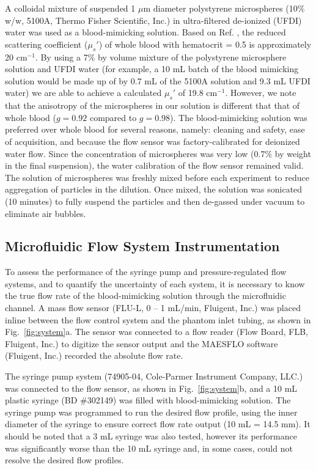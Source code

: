 \documentclass[12pt]{spieman}
\begin{document}
\begin{spacing}{2}
A colloidal mixture of suspended 1 $\mu$m diameter polystyrene microspheres (10\% w/w, 5100A, Thermo Fisher Scientific, Inc.) in ultra-filtered de-ionized (UFDI) water was used as a blood-mimicking solution. Based on Ref. \cite[]{Roggan:1999bz}, the reduced scattering coefficient ($\mu_s'$) of whole blood with hematocrit = 0.5 is approximately 20 cm$^{-1}$. By using a 7\% by volume mixture of the polystyrene microsphere solution and UFDI water (for example, a 10 mL batch of the blood mimicking solution would be made up of by 0.7 mL of the 5100A solution and 9.3 mL UFDI water) we are able to achieve a calculated $\mu_s'$ of 19.8 cm$^{-1}$. However, we note that the anisotropy of the microspheres in our solution is different that that of whole blood ($g = 0.92$ compared to $g = 0.98$). The blood-mimicking solution was preferred over whole blood for several reasons, namely: cleaning and safety, ease of acquisition, and because the flow sensor was factory-calibrated for deionized water flow. Since the concentration of microspheres was very low (0.7\% by weight in the final suspension), the water calibration of the flow sensor remained valid. The solution of microspheres was freshly mixed before each experiment to reduce aggregation of particles in the dilution. Once mixed, the solution was sonicated (10 minutes) to fully suspend the particles and then de-gassed under vacuum to eliminate air bubbles.


\subsection{Microfluidic Flow System Instrumentation}

To assess the performance of the syringe pump and pressure-regulated flow systems, and to quantify the uncertainty of each system, it is necessary to know the true flow rate of the blood-mimicking solution through the microfluidic channel. A mass flow sensor (FLU-L, 0 -- 1 mL/min, Fluigent, Inc.) was placed inline between the flow control system and the phantom inlet tubing, as shown in Fig.~\ref{fig:system}a. The sensor was connected to a flow reader (Flow Board, FLB, Fluigent, Inc.) to digitize the sensor output and the MAESFLO software (Fluigent, Inc.) recorded the absolute flow rate.

The syringe pump system (74905-04, Cole-Parmer Instrument Company, LLC.) was connected to the flow sensor, as shown in Fig.~\ref{fig:system}b, and a 10 mL plastic syringe (BD \#302149) was filled with blood-mimicking solution. The syringe pump was programmed to run the desired flow profile, using the inner diameter of the syringe to ensure correct flow rate output (10 mL = 14.5 mm). It should be noted that a 3 mL syringe was also tested, however its performance was significantly worse than the 10 mL syringe and, in some cases, could not resolve the desired flow profiles.


\end{spacing}
\end{document}
